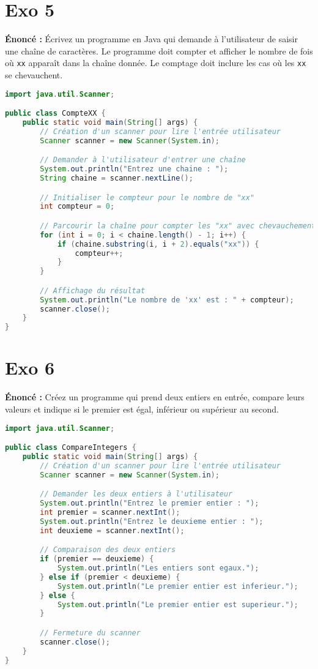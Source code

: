 \documentclass{article}
\begin{document}
\section*{Exo 5}
\noindent \textbf{Énoncé :} Écrivez un programme en Java qui demande \`a l'utilisateur de saisir une cha\^ine de caract\`eres. Le programme doit compter et afficher le nombre de fois o\`u \texttt{xx} appara\^it dans la cha\^ine donn\'ee. Le comptage doit inclure les cas o\`u les \texttt{xx} se chevauchent.

\begin{lstlisting}[language=Java]
import java.util.Scanner;

public class CompteXX {
    public static void main(String[] args) {
        // Création d'un scanner pour lire l'entrée utilisateur
        Scanner scanner = new Scanner(System.in);

        // Demander à l'utilisateur d'entrer une chaîne
        System.out.println("Entrez une chaine : ");
        String chaine = scanner.nextLine();

        // Initialiser le compteur pour le nombre de "xx"
        int compteur = 0;

        // Parcourir la chaîne pour compter les "xx" avec chevauchement
        for (int i = 0; i < chaine.length() - 1; i++) {
            if (chaine.substring(i, i + 2).equals("xx")) {
                compteur++;
            }
        }

        // Affichage du résultat
        System.out.println("Le nombre de 'xx' est : " + compteur);
        scanner.close();
    }
}
\end{lstlisting}
\clearpage

\section*{Exo 6}
\noindent \textbf{Énoncé :} Créez un programme qui prend deux entiers en entrée, compare leurs valeurs et indique si le premier est égal, inférieur ou supérieur au second.

\begin{lstlisting}[language=Java]
import java.util.Scanner;

public class CompareIntegers {
    public static void main(String[] args) {
        // Création d'un scanner pour lire l'entrée utilisateur
        Scanner scanner = new Scanner(System.in);

        // Demander les deux entiers à l'utilisateur
        System.out.println("Entrez le premier entier : ");
        int premier = scanner.nextInt();
        System.out.println("Entrez le deuxieme entier : ");
        int deuxieme = scanner.nextInt();

        // Comparaison des deux entiers
        if (premier == deuxieme) {
            System.out.println("Les entiers sont egaux.");
        } else if (premier < deuxieme) {
            System.out.println("Le premier entier est inferieur.");
        } else {
            System.out.println("Le premier entier est superieur.");
        }

        // Fermeture du scanner
        scanner.close();
    }
}
\end{lstlisting}
\clearpage
\end{document}
